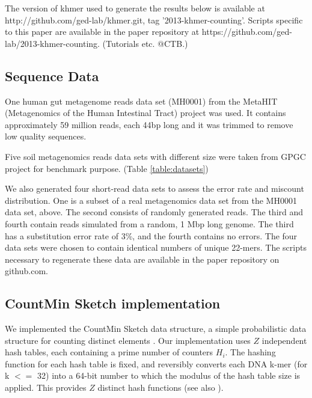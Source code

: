 \documentclass{article}
\begin{document}

The version of khmer used to generate the results below is available
at http://github.com/ged-lab/khmer.git, tag '2013-khmer-counting'.
Scripts specific to this paper are available in the paper repository
at https://github.com/ged-lab/2013-khmer-counting.  (Tutorials etc. @CTB.)

\subsection{Sequence Data}

One human gut metagenome reads data set (MH0001) from the 
MetaHIT (Metagenomics of the Human Intestinal Tract) project\cite{Qin2010} was used. 
It contains approximately 59 million reads, each 44bp long and it was trimmed to remove low quality sequences. 

Five soil metagenomics reads data sets with different size were taken
from GPGC project for benchmark purpose.
(Table \ref{table:datasets})

We also generated four short-read data sets to assess the error
rate and miscount distribution. One is a subset of a real
metagenomics data set from the MH0001 data set, above. The second
consists of randomly generated reads. The third and fourth contain
reads simulated from a random, 1 Mbp long genome.  The third has a
substitution error rate of 3\%, and the fourth contains no errors. The
four data sets were chosen to contain identical numbers of unique
22-mers.  The scripts necessary to regenerate these data are available
in the paper repository on github.com.


\subsection{CountMin Sketch implementation}

We implemented the CountMin Sketch data structure, a simple
probabilistic data structure for counting distinct elements
\cite{Cormode2005}.  Our implementation uses $Z$ independent hash
tables, each containing a prime number of counters $H_i$.  The hashing
function for each hash table is fixed, and reversibly converts each
DNA k-mer (for k $<=$ 32) into a 64-bit number to which the modulus of
the hash table size is applied.  This provides $Z$ distinct hash
functions (see also \cite{adina2013}).
\end{document}
